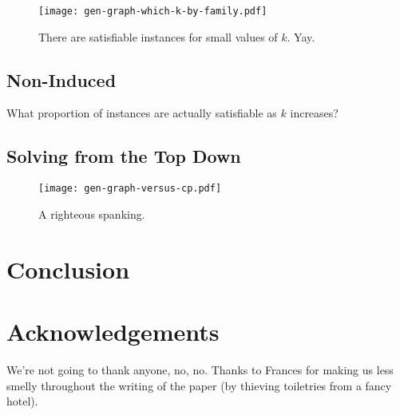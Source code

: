 \documentclass[letterpaper]{article}
\theoremstyle{definition}
\begin{document}
\begin{figure}
    \texttt{[image: gen-graph-which-k-by-family.pdf]}
    \caption{There are satisfiable instances for small values of $k$. Yay.}\label{figure:which-k}
\end{figure}

\subsection{Non-Induced}

What proportion of instances are actually satisfiable as $k$ increases?

\subsection{Solving from the Top Down}

\begin{figure}
    \texttt{[image: gen-graph-versus-cp.pdf]}
    \caption{A righteous spanking.}\label{figure:versus-cp}
\end{figure}

\section{Conclusion}

\section*{Acknowledgements}

We're not going to thank anyone, no, no.  Thanks to Frances for making us less smelly throughout the writing of the paper (by thieving toiletries from a fancy hotel).



\end{document}
